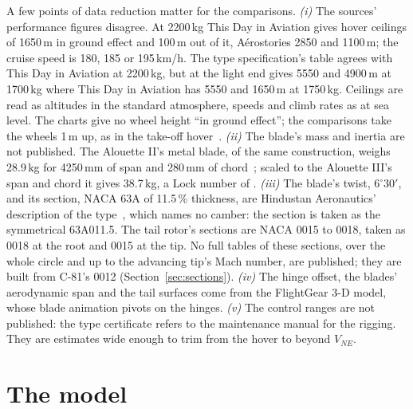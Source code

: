 \documentclass[10pt,a4paper,twocolumn]{article}
\begin{document}
A few points of data reduction matter for the comparisons.
\emph{(i)} The sources' performance figures disagree. At 2200\,kg This Day in Aviation gives hover ceilings of 1650\,m in ground effect and 100\,m
out of it, A\'erostories 2850 and 1100\,m; the cruise speed is 180, 185 or 195\,km/h. The type specification's table agrees with This Day
in Aviation at 2200\,kg, but at the light end gives 5550 and 4900\,m at 1700\,kg where This Day in Aviation has 5550 and 1650\,m at
1750\,kg. Ceilings are read as altitudes in the standard atmosphere, speeds and climb rates as at sea level. The charts give no wheel
height ``in ground effect''; the comparisons take the wheels 1\,m up, as in the take-off hover~\cite{lm}.
\emph{(ii)} The blade's mass and inertia are not published. The Alouette II's metal blade, of the same construction, weighs 28.9\,kg for 4250\,mm
of span and 280\,mm of chord~\cite{e88}; scaled to the Alouette III's span and chord it gives 38.7\,kg, a Lock number of \NLock.
\emph{(iii)} The blade's twist, 6$^\circ$30$'$, and its section, NACA 63A of 11.5\,\% thickness, are Hindustan
Aeronautics' description of the type~\cite{hl}, which names no camber: the section is taken as the symmetrical 63A011.5. The tail
rotor's sections are NACA 0015 to 0018, taken as 0018 at the root and 0015 at the tip. No full tables of these sections, over the
whole circle and up to the advancing tip's Mach number, are published; they are built from C-81's 0012 (Section~\ref{sec:sections}).
\emph{(iv)} The hinge offset, the blades' aerodynamic span and the tail surfaces come from the FlightGear 3-D model, whose blade animation
pivots on the hinges.
\emph{(v)} The control ranges are not published: the type certificate refers to the maintenance manual for the rigging. They
are estimates wide enough to trim from the hover to beyond $V_{NE}$.

\section{The model}\label{sec:model}
\end{document}
